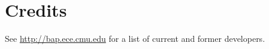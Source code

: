 \chapter{Credits}
See \url{http://bap.ece.cmu.edu} for a list of current and former \bap
developers.
